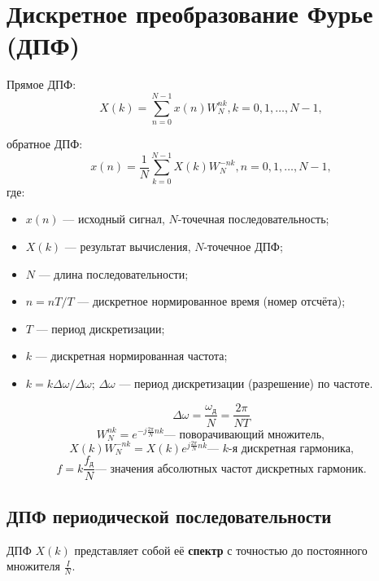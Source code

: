 \documentclass[a4paper, 14pt]{extarticle}
\begin{document}
\section{Дискретное преобразование Фурье (ДПФ)}
Прямое ДПФ:
\begin{equation}
    X(k) = \sum^{N-1}_{n=0} x(n) W^{nk}_N, k = 0, 1, \ldots, N - 1,
\end{equation}

обратное ДПФ:
\begin{equation}
    x(n) = \frac{1}{N} \sum^{N-1}_{k=0} X(k) W_N^{-nk}, n = 0, 1, \ldots, N - 1,
\end{equation}
где:
\begin{itemize}
    \item $x(n)$ --- исходный сигнал, $N$-точечная последовательность;
    \item $X(k)$ --- результат вычисления, $N$-точечное ДПФ;
    \item $N$ --- длина последовательности;
    \item $n = nT/T$ --- дискретное нормированное время (номер отсчёта);
    \item $T$ --- период дискретизации;
    \item $k$ --- дискретная нормированная частота;
    \item $k = k\Delta\omega / \Delta\omega$; $\Delta\omega$ --- период дискретизации (разрешение) по частоте.
\end{itemize}
\begin{equation*}
    \Delta\omega = \frac{\omega_\text{д}}{N} = \frac{2\pi}{NT}
\end{equation*}
\begin{equation*}
    W^{nk}_N = e^{-j \frac{2\pi}{N}nk} \text{--- поворачивающий множитель},
\end{equation*}
\begin{equation*}
    X(k) W^{-nk}_N = X(k) e^{j \frac{2\pi}{N} nk} \text{--- $k$-я дискретная гармоника,}
\end{equation*}
\begin{equation*}
    f = k \frac{f_\text{д}}{N} \text{--- значения абсолютных частот дискретных гармоник}.
\end{equation*}

\subsection{ДПФ периодической последовательности}
ДПФ $X(k)$ представляет собой её \textbf{спектр} с точностью до постоянного множителя $ \frac{I}{N}$.
\end{document}
